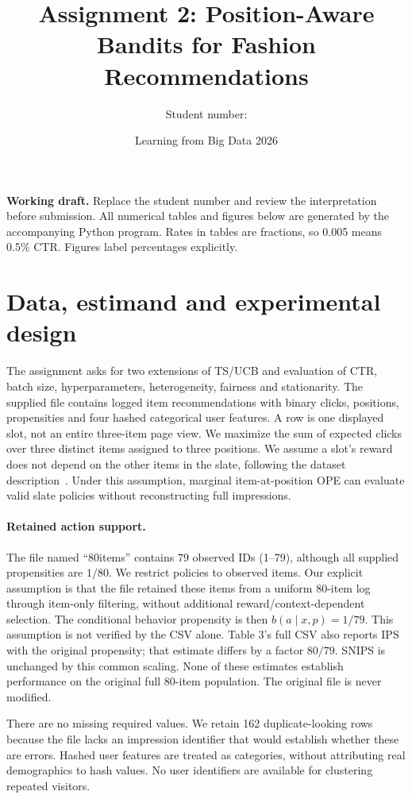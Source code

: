 \documentclass[11pt,a4paper]{article}
\title{Assignment 2: Position-Aware Bandits for Fashion Recommendations}
\author{Student number: \studentnumber}
\date{Learning from Big Data 2026}
\begin{document}
\maketitle
\noindent\textbf{Working draft.} Replace the student number and review the interpretation before submission.
All numerical tables and figures below are generated by the accompanying Python program.
Rates in tables are fractions, so 0.005 means 0.5\% CTR. Figures label percentages explicitly.

\section{Data, estimand and experimental design}
The assignment asks for two extensions of TS/UCB and evaluation of CTR, batch size,
hyperparameters, heterogeneity, fairness and stationarity. The supplied file contains
logged item recommendations with binary clicks, positions, propensities and four hashed
categorical user features. A row is one displayed slot, not an entire three-item page view.
We maximize the sum of expected clicks over three distinct items assigned to three positions.
We assume a slot's reward does not depend on the other items in the slate, following the
dataset description~\cite{saito}. Under this assumption, marginal item-at-position OPE
can evaluate valid slate policies without reconstructing full impressions.

\paragraph{Retained action support.}
The file named ``80items'' contains 79 observed IDs (1--79), although all supplied
propensities are $1/80$. We restrict policies to observed items. Our explicit assumption
is that the file retained these items from a uniform 80-item log through item-only
filtering, without additional reward/context-dependent selection. The conditional
behavior propensity is then $b(a\mid x,p)=1/79$. This assumption is not verified by
the CSV alone. Table 3's full CSV also reports IPS with the original propensity; that
estimate differs by a factor $80/79$. SNIPS is unchanged by this common scaling.
None of these estimates establish performance on the original full 80-item population.
The original file is never modified.

There are no missing required values. We retain 162 duplicate-looking rows because
the file lacks an impression identifier that would establish whether these are errors.
Hashed user features are treated as categories, without attributing real demographics
to hash values. No user identifiers are available for clustering repeated visitors.
\end{document}
